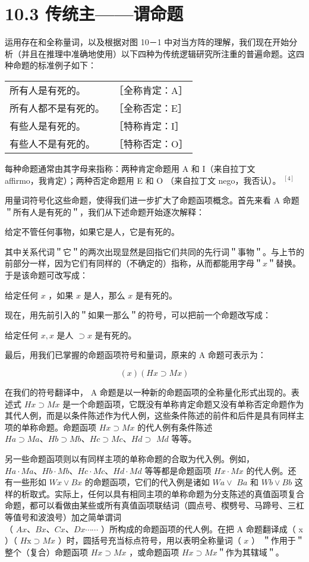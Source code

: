 \section*{10.3 传统主——谓命题}
运用存在和全称量词，以及根据对图 10－1 中对当方阵的理解，我们现在开始分析（并且在推理中准确地使用）以下四种为传统逻辑研究所注重的普遍命题。这四种命题的标准例子如下：

\begin{center}
\begin{tabular}{ll}
所有人是有死的。 & ［全称肯定：A］ \\
所有人都不是有死的。 & ［全称否定：E］ \\
有些人是有死的。 & ［特称肯定：I］ \\
有些人不是有死的。 & ［特称否定：O］ \\
\end{tabular}
\end{center}

每种命题通常由其字母来指称：两种肯定命题用 A 和 I（来自拉丁文\\
affirmo，我肯定）；两种否定命题用 E 和 O （来自拉丁文 nego，我否认）。 ${ }^{[4]}$

用量词符号化这些命题，使得我们进一步扩大了命题函项概念。首先来看 A 命题＂所有人是有死的＂，我们从下述命题开始逐次解释：

给定不管任何事物，如果它是人，它是有死的。

其中关系代词＂它＂的两次出现显然是回指它们共同的先行词＂事物＂。与上节的前部分一样，因为它们有同样的（不确定的）指称，从而都能用字母＂$x$＂替换。于是该命题可改写成：

给定任何 $x$ ，如果 $x$ 是人，那么 $x$ 是有死的。

现在，用先前引入的＂如果一那么＂的符号，可以把前一个命题改写成：

给定任何 $x, x$ 是人 $\supset x$ 是有死的。

最后，用我们已掌握的命题函项符号和量词，原来的 A 命题可表示为：

$$
(x)(H x \supset M x)
$$

在我们的符号翻译中， A 命题是以一种新的命题函项的全称量化形式出现的。表述式 $H x \supset M x$ 是一个命题函项，它既没有单称肯定命题又没有单称否定命题作为其代人例，而是以条件陈述作为代人例，这些条件陈述的前件和后件是具有同样主项的单称命题。命题函项 $H x \supset M x$ 的代人例有条件陈述 $H a \supset M a 、 H b \supset M b 、 H c \supset M c 、 H d \supset$ $M d$ 等等。

另一些命题函项则以有同样主项的单称命题的合取为代入例。例如， $H a \cdot M a 、 H b \cdot M b 、 H c \cdot M c 、 H d \cdot M d$ 等等都是命题函项 $H x \cdot M x$ 的代人例。还有一些形如 $W x \vee B x$ 的命题函项，它们的代入例是诸如 $W a \vee$ $B a$ 和 $W b \vee B b$ 这样的析取式。实际上，任何以具有相同主项的单称命题为分支陈述的真值函项复合命题，都可以看做由某些或所有真值函项联结词（圆点号、楔劈号、马蹄号、三杠等值号和波浪号）加之简单谓词\\
（ $A x 、 B x 、 C x 、 D x \cdots \cdots$ ）所构成的命题函项的代人例。在把 A 命题翻译成（ x ）（ $H \mathrm{x} \supset M x$ ）时，圆括号充当标点符号，用以表明全称量词（ $x$ ） ＂作用于＂整个（复合）命题函项 $H x \supset M x$ ，或命题函项 $H x \supset M x$＂作为其辖域＂。


